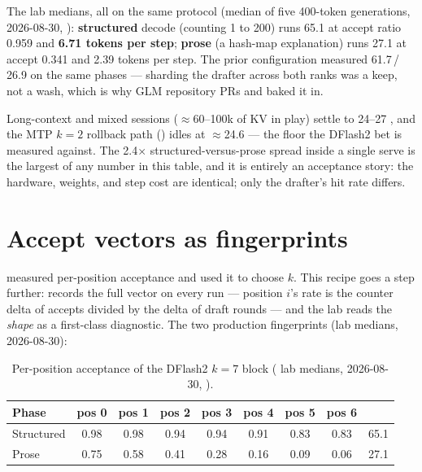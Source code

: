 The lab medians, all on the same protocol (median of five 400-token
generations, 2026-08-30, ):
\textbf{structured} decode (counting 1 to 200) runs
65.1 \tokspersec{} at accept ratio 0.959 and \textbf{6.71 tokens per step};
\textbf{prose} (a hash-map explanation) runs 27.1 \tokspersec{} at accept
0.341 and 2.39 tokens per step. The prior 
configuration measured 61.7\,/\,26.9 on the same phases --- sharding the
drafter across both ranks was a keep, not a wash, which is why GLM repository PRs
 and  baked it in.

Long-context and mixed sessions
($\approx$60--100k of KV in play) settle to 24--27 \tokspersec{}, and the
MTP $k{=}2$ rollback path () idles at
$\approx$24.6 \tokspersec{} --- the floor the DFlash2 bet is measured
against. The 2.4$\times$ structured-versus-prose spread inside a single
serve is the largest of any number in this table, and it is entirely an
acceptance story: the hardware, weights, and step cost are identical; only
the drafter's hit rate differs.

\section{Accept vectors as fingerprints}
\label{sec:dflash2-fingerprints}

 measured per-position acceptance and used it to choose
$k$. This recipe goes a step further: 
records the full vector on every run --- position $i$'s rate is the counter
delta of  accepts divided by the delta of draft rounds
--- and the lab reads the \emph{shape} as a first-class diagnostic. The two
production fingerprints (lab medians, 2026-08-30):

\begin{table}[htbp]
\centering\small
\caption{Per-position acceptance of the DFlash2 $k{=}7$ block
( lab medians, 2026-08-30,
).}
\label{tab:dflash2-vectors}
\begin{tabular}{l ccccccc r}
\toprule
Phase & pos 0 & pos 1 & pos 2 & pos 3 & pos 4 & pos 5 & pos 6 & \tokspersec{} \\
\midrule
Structured & 0.98 & 0.98 & 0.94 & 0.94 & 0.91 & 0.83 & 0.83 & 65.1 \\
Prose      & 0.75 & 0.58 & 0.41 & 0.28 & 0.16 & 0.09 & 0.06 & 27.1 \\
\bottomrule
\end{tabular}
\end{table}

